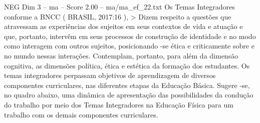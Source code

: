 \begin{textsample}{NEG Dim 3 – ma – Score 2.00 – ma/ma\_ef\_22.txt}
Os Temas Integradores conforme a BNCC ( BRASIL, 2017:16 ), > Dizem respeito a questões que atravessam as experiências dos sujeitos em seus contextos de vida e atuação e que, portanto, intervêm em seus processos de construção de identidade e no modo como interagem com outros sujeitos, posicionando -se ética e criticamente sobre e no mundo nessas interações.
Contemplam, portanto, para além da dimensão cognitiva, as dimensões política, ética e estética da formação dos estudantes.
Os temas integradores perpassam objetivos de aprendizagem de diversos componentes curriculares, nas diferentes etapas da Educação Básica.
Sugere -se, no quadro abaixo, uma dinâmica de apresentação das possibilidades da condução do trabalho por meio dos Temas Integradores na Educação Física para um trabalho com os demais componentes curriculares.

\end{textsample}
